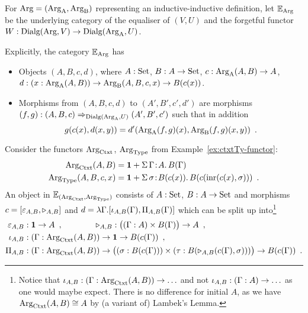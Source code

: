 \documentclass[orivec,envcountsame, ,envcountsect]{llncs}
\begin{document}
\begin{definition}
  For $\text{Arg} = (\text{Arg}_{\text{A}}, \text{Arg}_{\text{B}})$ representing an inductive-inductive
  definition, let $\mathbb{E}_{\text{Arg}}$ be the underlying category of
  the equaliser of $(V, U)$ and the forgetful functor ${W :
    \text{Dialg}(\text{Arg}, V) \to \text{Dialg}(\text{Arg}_{\text{A}}, U)}$.
\end{definition}
Explicitly, the category $\mathbb{E}_{\text{Arg}}$ has
\begin{itemize}
\item Objects $(A, B, c, d)$, where $A : \text{Set}$, $B : A \to \text{Set}$, $c : \text{Arg}_{\text{A}}(A, B) \to A$, $d : (x : \text{Arg}_{\text{A}}(A, B)) \to \text{Arg}_{\text{B}}(A, B, c, x) \to B(c(x))$.
\item Morphisms from $(A, B, c, d)$ to $(A', B', c', d')$ are morphisms \\ $(f, g) :
  (A, B, c) \Rightarrow_{\text{Dialg}(\text{Arg}_{\text{A}}, U)} (A', B', c')$ such that in addition
  \[
  g(c(x), d(x, y)) = d'(\text{Arg}_{\text{A}}(f,g)(x), \text{Arg}_{\text{B}}(f,g)(x, y)) \enspace .
  \]
\end{itemize}


\begin{example}
  Consider the functors $\text{Arg}_{\text{Ctxt}}$, $\text{Arg}_{\text{Type}}$ from Example~\ref{ex:ctxtTy-functor}:
\begin{align*}
  \text{Arg}_{\text{Ctxt}}(A, B) &= \mathbf{1} + \Sigma\, \Gamma\!:\!A .\, B(\Gamma)\\
  \text{Arg}_{\text{Type}}(A, B, c, x) &= \mathbf{1} + \Sigma\,  \sigma\!:\! B(c(x)).\, B(c(\text{inr}(c(x), \sigma))) \enspace .
\end{align*}
An object in $\mathbb{E}_{(\text{Arg}_{\text{Ctxt}}, \text{Arg}_{\text{Type}})}$ consists of $A : \text{Set}$, $B :
A \to \text{Set}$ and morphisms $c =
[\varepsilon_{A,B}, \triangleright_{A,B}]$ and $d = \lambda \Gamma . [\iota_{A,B}(\Gamma), \Pi_{A,B}(\Gamma)]$ which can be
split up into\footnote{Notice that $\iota_{A,B} : (\Gamma :
  \text{Arg}_{\text{Ctxt}}(A, B)) \to \ldots$ and not $\iota_{A,B} : (\Gamma :
  A) \to \ldots$ as one would maybe expect. There is no difference for
  initial $A$, as we have $\text{Arg}_{\text{Ctxt}}(A, B) \cong A$ by (a
  variant of) Lambek's Lemma.}
\begin{align*}
  \varepsilon_{A,B} &: \mathbf{1} \to A \enspace , \qquad\qquad \triangleright_{A,B} : \big((\Gamma : A) \times B(\Gamma)\big) \to A  \enspace , \\
\iota_{A,B} &: (\Gamma : \text{Arg}_{\text{Ctxt}}(A, B)) \to \mathbf{1} \to B(c(\Gamma)) \enspace , \\
\Pi_{A,B} &: (\Gamma : \text{Arg}_{\text{Ctxt}}(A, B)) \to \big((\sigma : B(c(\Gamma))) \times (\tau : B(\triangleright_{A,B}(c(\Gamma), \sigma)))\big) \to B(c(\Gamma)) \enspace.
\end{align*}
\end{example}
\end{document}
